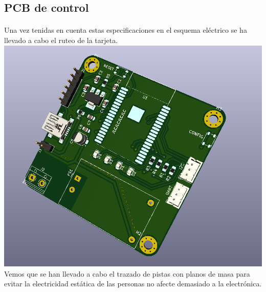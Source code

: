 \documentclass[a4paper ,12pt, onecolumn]{article}
\begin{document}
    \subsection{PCB de control}
        \paragraph{}
        Una vez tenidas en cuenta estas especificaciones en el esquema eléctrico 
        se ha llevado a cabo el ruteo de la tarjeta.
        \includegraphics[scale=0.4]{../receiver_1.PNG}
        Vemos que se han llevado a cabo el trazado de pistas con planos de masa para evitar la 
        electricidad estática de las personas no afecte demasiado a la electrónica.
\end{document}
